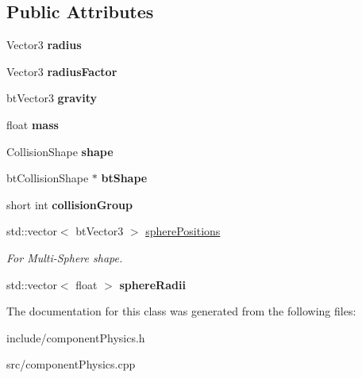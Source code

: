 \subsection*{\-Public \-Attributes}
\begin{DoxyCompactItemize}
\item 
\hypertarget{classComponentTemplatePhysics_a5b8f0ff60881988f4567b832b18c39a2}{
\-Vector3 {\bfseries radius}}
\label{d3/dcb/classComponentTemplatePhysics_a5b8f0ff60881988f4567b832b18c39a2}

\item 
\hypertarget{classComponentTemplatePhysics_a2d29021ca3fc68f7d5718d318d71bd2f}{
\-Vector3 {\bfseries radius\-Factor}}
\label{d3/dcb/classComponentTemplatePhysics_a2d29021ca3fc68f7d5718d318d71bd2f}

\item 
\hypertarget{classComponentTemplatePhysics_acd8c551b068f0602578b633bdb19f6e5}{
bt\-Vector3 {\bfseries gravity}}
\label{d3/dcb/classComponentTemplatePhysics_acd8c551b068f0602578b633bdb19f6e5}

\item 
\hypertarget{classComponentTemplatePhysics_aa25e5501666b80d15487a0d1165121ac}{
float {\bfseries mass}}
\label{d3/dcb/classComponentTemplatePhysics_aa25e5501666b80d15487a0d1165121ac}

\item 
\hypertarget{classComponentTemplatePhysics_a13d3d7bc77575a74f3d71a2f1925bea5}{
\-Collision\-Shape {\bfseries shape}}
\label{d3/dcb/classComponentTemplatePhysics_a13d3d7bc77575a74f3d71a2f1925bea5}

\item 
\hypertarget{classComponentTemplatePhysics_a162f55a04cecde51596aa7b9c29f2d91}{
bt\-Collision\-Shape $\ast$ {\bfseries bt\-Shape}}
\label{d3/dcb/classComponentTemplatePhysics_a162f55a04cecde51596aa7b9c29f2d91}

\item 
\hypertarget{classComponentTemplatePhysics_ad05c7b64441b050c9138cd2256b06513}{
short int {\bfseries collision\-Group}}
\label{d3/dcb/classComponentTemplatePhysics_ad05c7b64441b050c9138cd2256b06513}

\item 
\hypertarget{classComponentTemplatePhysics_ad8bff9ae398d6ec1cffd732be89dc491}{
std\-::vector$<$ bt\-Vector3 $>$ \hyperlink{classComponentTemplatePhysics_ad8bff9ae398d6ec1cffd732be89dc491}{sphere\-Positions}}
\label{d3/dcb/classComponentTemplatePhysics_ad8bff9ae398d6ec1cffd732be89dc491}

\begin{DoxyCompactList}\small\item\em \-For \-Multi-\/\-Sphere shape. \end{DoxyCompactList}\item 
\hypertarget{classComponentTemplatePhysics_aeb645a1a180234c95b94a902026a97c1}{
std\-::vector$<$ float $>$ {\bfseries sphere\-Radii}}
\label{d3/dcb/classComponentTemplatePhysics_aeb645a1a180234c95b94a902026a97c1}

\end{DoxyCompactItemize}


\-The documentation for this class was generated from the following files\-:\begin{DoxyCompactItemize}
\item 
include/component\-Physics.\-h\item 
src/component\-Physics.\-cpp\end{DoxyCompactItemize}
